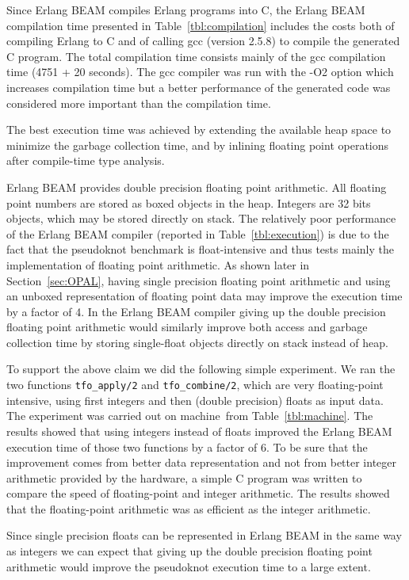 Since Erlang BEAM compiles Erlang programs into C, the Erlang BEAM
compilation time presented in Table~\ref{tbl:compilation} includes the
costs both of compiling Erlang to C and of calling gcc (version 2.5.8)
to compile the generated C program. The total compilation time consists
mainly of the gcc compilation time (4751 + 20 seconds). The gcc
compiler was run with the -O2 option which increases compilation time
but a better performance of the generated code was considered more
important than the compilation time.

The best execution time was achieved by extending the available heap
space to minimize the garbage collection time, and by inlining floating
point operations after compile-time type analysis.

Erlang BEAM provides double precision floating point arithmetic. All
floating point numbers are stored as boxed objects in the heap.
Integers are 32 bits objects, which may be stored directly on stack.
The relatively poor performance of the Erlang BEAM compiler (reported
in Table~\ref{tbl:execution}) is due to the fact that the pseudoknot
benchmark is float-intensive and thus tests mainly the implementation
of floating point arithmetic. As shown later in Section~\ref{sec:OPAL},
having single precision floating point arithmetic and using an unboxed
representation of floating point data may improve the execution time by
a factor of 4. In the Erlang BEAM compiler giving up the double
precision floating point arithmetic would similarly improve both access
and garbage collection time by storing single-float objects directly on
stack instead of heap.

To support the above claim we did the following simple experiment. We
ran the two functions \verb=tfo_apply/2= and \verb=tfo_combine/2=,
which are very floating-point intensive, using first integers and then
(double precision) floats as input data. The experiment was carried out
on machine~\sysfloat from Table~\ref{tbl:machine}. The results showed
that using integers instead of floats improved the Erlang BEAM
execution time of those two functions by a factor of 6. To be sure that
the improvement comes from better data representation and not from
better integer arithmetic provided by the hardware, a simple C program
was written to compare the speed of floating-point and integer
arithmetic. The results showed that the floating-point arithmetic was
as efficient as the integer arithmetic.

Since single precision floats can be represented in Erlang BEAM in the
same way as integers we can expect that giving up the double precision
floating point arithmetic would improve the pseudoknot execution time
to a large extent.

